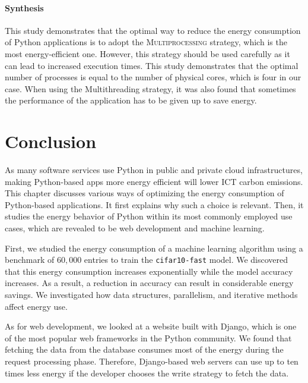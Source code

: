 \paragraph*{Synthesis}
This study demonstrates that the optimal way to reduce the energy consumption of Python applications is to adopt the \textsc{Multiprocessing} strategy, which is the most energy-efficient one.
However, this strategy should be used carefully as it can lead to increased execution times.
This study demonstrates that the optimal number of processes is equal to the number of physical cores, which is four in our case.
When using the \textsf{Multithreading} strategy, it was also found that sometimes the performance of the application has to be given up to save energy.

\clearpage

\clearpage
\section{Conclusion}
As many software services use Python in public and private cloud infrastructures, making Python-based apps more energy efficient will lower ICT carbon emissions.
This chapter discusses various ways of optimizing the energy consumption of Python-based applications.
It first explains why such a choice is relevant.
Then, it studies the energy behavior of Python within its most commonly employed use cases, which are revealed to be web development and machine learning.


First, we studied the energy consumption of a machine learning algorithm using a benchmark of $60,000$ entries to train the \texttt{cifar10-fast} model.
We discovered that this energy consumption increases exponentially while the model accuracy increases.
As a result, a reduction in accuracy can result in considerable energy savings.
We investigated how data structures, parallelism, and iterative methods affect energy use.

As for web development, we looked at a website built with Django, which is one of the most popular web frameworks in the Python community.
We found that fetching the data from the database consumes most of the energy during the request processing phase.
Therefore, Django-based web servers can use up to ten times less energy if the developer chooses the write strategy to fetch the data.

